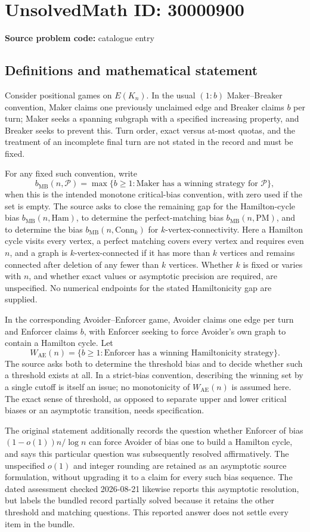 \documentclass[11pt]{article}
\begin{document}
\section*{UnsolvedMath ID: 30000900}
\textbf{Source problem code:} catalogue entry
\subsection{Definitions and mathematical statement}
Consider positional games on $E(K_n)$. In the usual $(1:b)$ Maker--Breaker convention, Maker claims one previously unclaimed edge and Breaker claims $b$ per turn; Maker seeks a spanning subgraph with a specified increasing property, and Breaker seeks to prevent this. Turn order, exact versus at-most quotas, and the treatment of an incomplete final turn are not stated in the record and must be fixed.

For any fixed such convention, write
\[
b_{\mathrm{MB}}(n,\mathcal P)=\max\{b\geq1:\text{Maker has a winning strategy for }\mathcal P\},
\]
when this is the intended monotone critical-bias convention, with zero used if the set is empty. The source asks to close the remaining gap for the Hamilton-cycle bias $b_{\mathrm{MB}}(n,\mathrm{Ham})$, to determine the perfect-matching bias $b_{\mathrm{MB}}(n,\mathrm{PM})$, and to determine the bias $b_{\mathrm{MB}}(n,\mathrm{Conn}_k)$ for $k$-vertex-connectivity. Here a Hamilton cycle visits every vertex, a perfect matching covers every vertex and requires even $n$, and a graph is $k$-vertex-connected if it has more than $k$ vertices and remains connected after deletion of any fewer than $k$ vertices. Whether $k$ is fixed or varies with $n$, and whether exact values or asymptotic precision are required, are unspecified. No numerical endpoints for the stated Hamiltonicity gap are supplied.

In the corresponding Avoider--Enforcer game, Avoider claims one edge per turn and Enforcer claims $b$, with Enforcer seeking to force Avoider's own graph to contain a Hamilton cycle. Let
\[
W_{\mathrm{AE}}(n)=\{b\geq1:\text{Enforcer has a winning Hamiltonicity strategy}\}.
\]
The source asks both to determine the threshold bias and to decide whether such a threshold exists at all. In a strict-bias convention, describing the winning set by a single cutoff is itself an issue; no monotonicity of $W_{\mathrm{AE}}(n)$ is assumed here. The exact sense of threshold, as opposed to separate upper and lower critical biases or an asymptotic transition, needs specification.

The original statement additionally records the question whether Enforcer of bias $(1-o(1))n/\log n$ can force Avoider of bias one to build a Hamilton cycle, and says this particular question was subsequently resolved affirmatively. The unspecified $o(1)$ and integer rounding are retained as an asymptotic source formulation, without upgrading it to a claim for every such bias sequence. The dated assessment checked 2026-08-21 likewise reports this asymptotic resolution, but labels the bundled record partially solved because it retains the other threshold and matching questions. This reported answer does not settle every item in the bundle.
\end{document}
